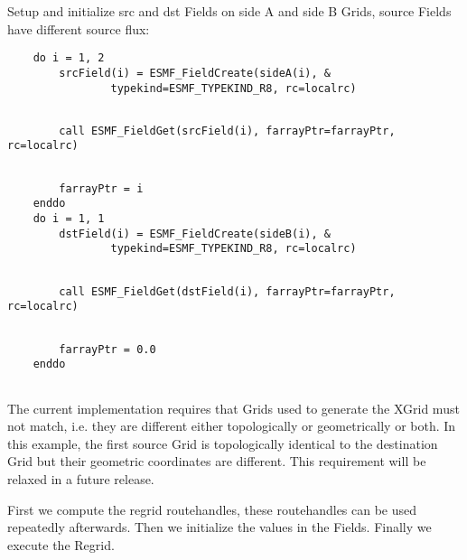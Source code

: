    Setup and initialize src and dst Fields on side A and side B Grids,
   source Fields have different source flux: 

 \begin{verbatim}
    do i = 1, 2
        srcField(i) = ESMF_FieldCreate(sideA(i), &
                typekind=ESMF_TYPEKIND_R8, rc=localrc)
 
\end{verbatim}
 

 \begin{verbatim}
        call ESMF_FieldGet(srcField(i), farrayPtr=farrayPtr, rc=localrc)
 
\end{verbatim}
 

 \begin{verbatim}
        farrayPtr = i
    enddo
    do i = 1, 1
        dstField(i) = ESMF_FieldCreate(sideB(i), &
                typekind=ESMF_TYPEKIND_R8, rc=localrc)
 
\end{verbatim}
 

 \begin{verbatim}
        call ESMF_FieldGet(dstField(i), farrayPtr=farrayPtr, rc=localrc)
 
\end{verbatim}
 

 \begin{verbatim}
        farrayPtr = 0.0
    enddo
 
\end{verbatim}
 

  
   The current implementation requires that Grids used to generate the XGrid
   must not match, i.e. they are different either topologically or geometrically or both.
   In this example, the first source Grid is topologically identical to the destination
   Grid but their geometric coordinates are different. This requirement will be relaxed
   in a future release.
  
   First we compute the regrid routehandles, these routehandles can be used repeatedly
   afterwards. Then we initialize the values in the Fields. Finally we execute the Regrid.
   
